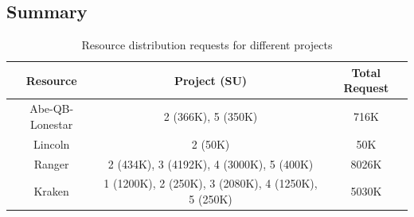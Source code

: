 \documentclass[a4paper,10pt]{article}
\newcommand{\up}{\vspace*{-1em}}
\begin{document}
% 




\subsection*{Summary}

\begin{table}[!h]
\up
\begin{center}
\begin{tabular}{|c| c | c | }
\hline 
Resource & Project (SU) & Total Request \\ 
\hline
Abe-QB-Lonestar  & 2 (366K), 5 (350K) &  716K  \\
Lincoln & 2 (50K) & 50K \\
Ranger & 2 (434K), 3 (4192K), 4 (3000K), 5 (400K)  & 8026K \\
Kraken & 1 (1200K), 2 (250K), 3 (2080K), 4 (1250K), 5 (250K) & 5030K \\
\hline
\end{tabular}
\end{center}
  \caption{\small Resource distribution requests for different projects \newline}\label{table:systems}
\up
\end{table}
\end{document}
